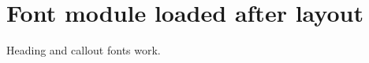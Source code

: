 \documentclass{article}
\begin{document}
\section{Font module loaded after layout}
\begin{note}Heading and callout fonts work.\end{note}
\end{document}
